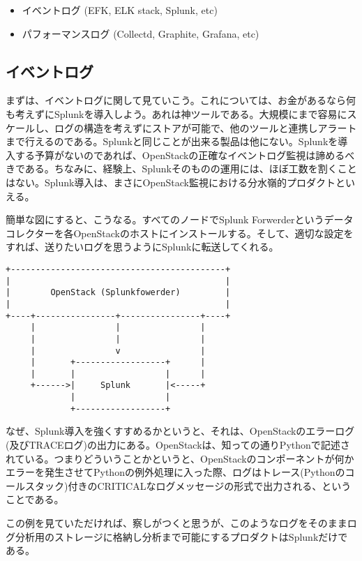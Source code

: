 \begin{itemize}
	\item イベントログ (EFK, ELK stack, Splunk, etc)
	\item パフォーマンスログ (Collectd, Graphite, Grafana, etc)
\end{itemize}

\subsection{イベントログ}
まずは、イベントログに関して見ていこう。これについては、お金があるなら何も考えずにSplunkを導入しよう。あれは神ツールである。大規模にまで容易にスケールし、ログの構造を考えずにストアが可能で、他のツールと連携しアラートまで行えるのである。Splunkと同じことが出来る製品は他にない。Splunkを導入する予算がないのであれば、OpenStackの正確なイベントログ監視は諦めるべきである。ちなみに、経験上、Splunkそのものの運用には、ほぼ工数を割くことはない。Splunk導入は、まさにOpenStack監視における分水嶺的プロダクトといえる。

簡単な図にすると、こうなる。すべてのノードでSplunk Forwerderというデータコレクターを各OpenStackのホストにインストールする。そして、適切な設定をすれば、送りたいログを思うようにSplunkに転送してくれる。

\begin{lstlisting}
+-------------------------------------------+
|                                           |
|        OpenStack (Splunkfowerder)         |
|                                           |
+----+----------------+----------------+----+
     |                |                |
     |                |                |
     |                v                |
     |       +------------------+      |
     |       |                  |      |
     +------>|     Splunk       |<-----+
             |                  |
             +------------------+
\end{lstlisting}

なぜ、Splunk導入を強くすすめるかというと、それは、OpenStackのエラーログ(及びTRACEログ)の出力にある。OpenStackは、知っての通りPythonで記述されている。つまりどういうことかというと、OpenStackのコンポーネントが何かエラーを発生させてPythonの例外処理に入った際、ログはトレース(Pythonのコールスタック)付きのCRITICALなログメッセージの形式で出力される、ということである。

この例を見ていただければ、察しがつくと思うが、このようなログをそのままログ分析用のストレージに格納し分析まで可能にするプロダクトはSplunkだけである。

